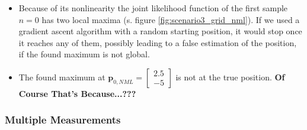\documentclass{article}
\begin{document}
\begin{itemize}
\item Because of its nonlinearity the joint likelihood function of the first sample $n=0$ has two local maxima (s. figure \ref{fig:scenario3_grid_nml}). If we used a gradient ascent algorithm with a random starting position, it would stop once it reaches any of them, possibly leading to a false estimation of the position, if the found maximum is not global.\\

\item The found maximum at $\mathbf{p}_{0,NML} = \left[\begin{array}{c} 2.5\\-5 \end{array}\right]$ is not at the true position. \textbf{Of Course That's Because...???}
\end{itemize}

\subsubsection{Multiple Measurements}
\end{document}
